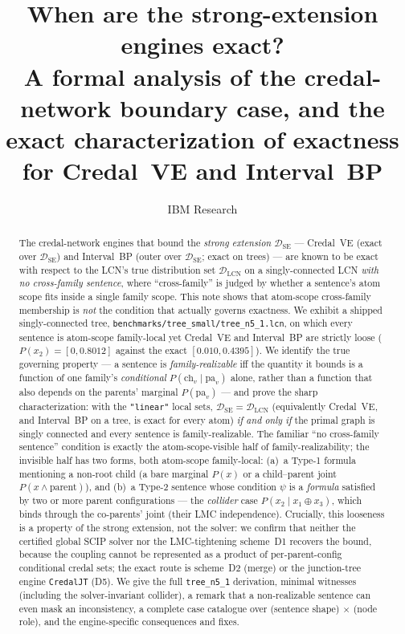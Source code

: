 \documentclass[11pt]{article}
\title{When are the strong-extension engines exact?\\
\large A formal analysis of the credal-network boundary case, and the exact
characterization of exactness for Credal~VE and Interval~BP}
\author{IBM Research}
\date{}
\newcommand{\DSE}{\mathcal{D}_{\mathrm{SE}}}
\newcommand{\DLCN}{\mathcal{D}_{\mathrm{LCN}}}
\newcommand{\ch}{\mathrm{ch}}
\newcommand{\pa}{\mathrm{pa}}
\begin{document}
\maketitle

\begin{abstract}
The credal-network engines that bound the \emph{strong extension} $\DSE$ --- Credal~VE (exact over
$\DSE$) and Interval~BP (outer over $\DSE$; exact on trees) --- are known to be exact with respect to
the LCN's true distribution set $\DLCN$ on a singly-connected LCN \emph{with no cross-family
sentence}, where ``cross-family'' is judged by whether a sentence's atom scope fits inside a single
family scope. This note shows that atom-scope cross-family membership is \emph{not} the condition that
actually governs exactness. We exhibit a shipped singly-connected tree,
\texttt{benchmarks/tree\_small/tree\_n5\_1.lcn}, on which every sentence is atom-scope family-local yet
Credal~VE and Interval~BP are strictly loose ($P(x_2)=[0,0.8012]$ against the exact $[0.010,0.4395]$).
We identify the true governing property --- a sentence is \emph{family-realizable} iff the quantity it
bounds is a function of one family's \emph{conditional} $P(\ch_v\mid\pa_v)$ alone, rather than a
function that also depends on the parents' marginal $P(\pa_v)$ --- and prove the sharp
characterization: with the \texttt{"linear"} local sets, $\DSE=\DLCN$ (equivalently Credal~VE, and
Interval~BP on a tree, is exact for every atom) \emph{if and only if} the primal graph is singly
connected and every sentence is family-realizable. The familiar ``no cross-family sentence'' condition
is exactly the atom-scope-visible half of family-realizability; the invisible half has two forms, both
atom-scope family-local: (a)~a Type-1 formula mentioning a non-root child (a bare marginal $P(x)$ or a
child--parent joint $P(x\wedge\text{parent})$), and (b)~a Type-2 sentence whose condition $\psi$ is a
\emph{formula} satisfied by two or more parent configurations --- the \emph{collider} case
$P(x_2\mid x_1\oplus x_3)$, which binds through the co-parents' joint (their LMC independence).
Crucially, this looseness is a property of the strong extension, not the solver: we confirm that
neither the certified global SCIP solver nor the LMC-tightening scheme~D1 recovers the bound, because
the coupling cannot be represented as a product of per-parent-config conditional credal sets; the
exact route is scheme~D2 (merge) or the junction-tree engine \texttt{CredalJT} (D5). We give the full
\texttt{tree\_n5\_1} derivation, minimal witnesses (including the solver-invariant collider), a remark
that a non-realizable sentence can even mask an inconsistency, a complete case catalogue over
(sentence shape) $\times$ (node role), and the engine-specific consequences and fixes.
\end{abstract}
\end{document}
